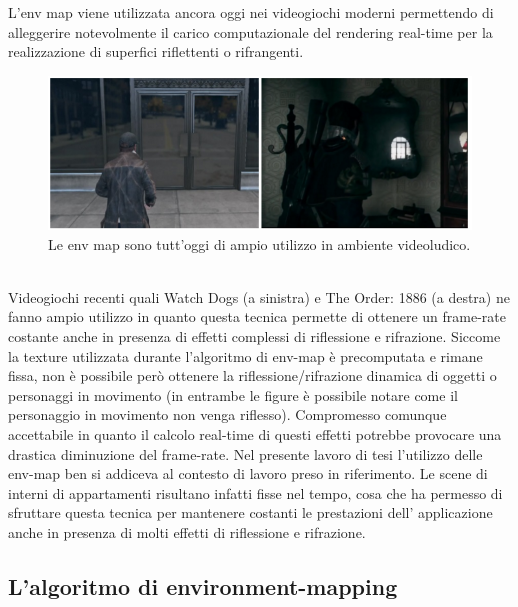 L’env map viene utilizzata ancora oggi nei videogiochi moderni permettendo di alleggerire notevolmente il carico computazionale del rendering real-time per la realizzazione di superfici riflettenti o rifrangenti.
\\
\begin{figure}[htb]
 \centering
 \includegraphics[width=1\linewidth]{images/chapter_stato_arte/stato_arte_wd_to.png}\hfill
 \caption[Le env map nei videogiochi]{Le env map sono tutt'oggi di ampio utilizzo in ambiente videoludico.}
 \label{fig:stato_arte_wd_to}
\end{figure}
\\
Videogiochi recenti quali Watch Dogs (a sinistra) e The Order: 1886 (a destra) ne fanno ampio utilizzo in quanto questa tecnica permette di ottenere un frame-rate costante anche in presenza di effetti complessi di riflessione e rifrazione. Siccome la texture utilizzata durante l’algoritmo di env-map è precomputata e rimane fissa, non è possibile però ottenere la riflessione/rifrazione dinamica di oggetti o personaggi in movimento (in entrambe le figure è possibile notare come  il personaggio in movimento non venga riflesso). Compromesso comunque accettabile in quanto il calcolo real-time di questi effetti potrebbe provocare una drastica diminuzione del frame-rate.
Nel presente lavoro di tesi l’utilizzo delle env-map ben si addiceva al contesto di lavoro preso in riferimento. Le scene di interni di appartamenti risultano infatti fisse nel tempo,  cosa che ha permesso di sfruttare questa tecnica per mantenere costanti le prestazioni dell’ applicazione anche in presenza di molti effetti di riflessione e rifrazione.

\subsection{L'algoritmo di environment-mapping}
\label{sec:chapter_stato_arte_algo_envmapping}

